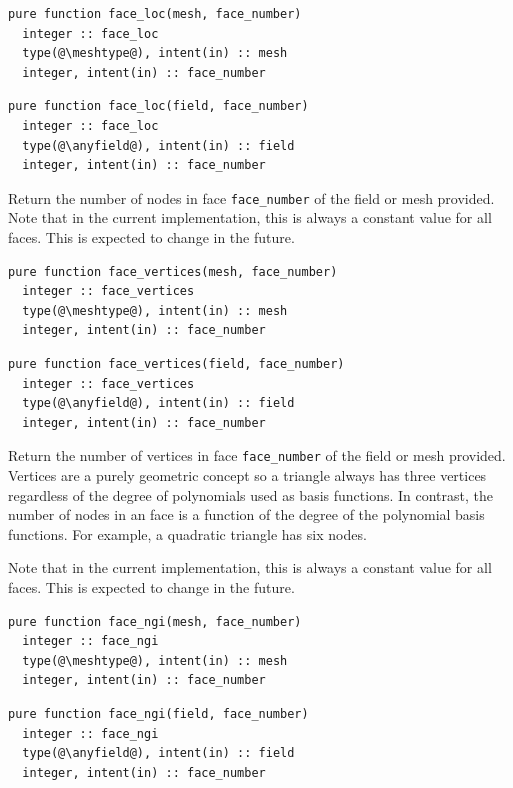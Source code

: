 \documentclass[a4paper, 11pt]{book}
\begin{document}
\begin{lstlisting}
pure function face_loc(mesh, face_number)
  integer :: face_loc
  type(@\meshtype@), intent(in) :: mesh
  integer, intent(in) :: face_number
\end{lstlisting}

\begin{lstlisting}
pure function face_loc(field, face_number)
  integer :: face_loc
  type(@\anyfield@), intent(in) :: field
  integer, intent(in) :: face_number
\end{lstlisting}

Return the number of nodes in face \lstinline+face_number+ of the field
or mesh provided. Note that in the current implementation, this is always a
constant value for all faces. This is expected to change in the future.


\begin{lstlisting}
pure function face_vertices(mesh, face_number)
  integer :: face_vertices
  type(@\meshtype@), intent(in) :: mesh
  integer, intent(in) :: face_number
\end{lstlisting}

\begin{lstlisting}
pure function face_vertices(field, face_number)
  integer :: face_vertices
  type(@\anyfield@), intent(in) :: field
  integer, intent(in) :: face_number
\end{lstlisting}

Return the number of vertices in face \lstinline+face_number+ of the field
or mesh provided. Vertices are a purely geometric concept so a triangle
always has three vertices regardless of the degree of polynomials used as 
basis functions. In contrast, the number of nodes in an face is a
function of the degree of the polynomial basis functions. For example, a
quadratic triangle has six nodes.

Note that in the current implementation, this is always a
constant value for all faces. This is expected to change in the future.



\begin{lstlisting}
pure function face_ngi(mesh, face_number)
  integer :: face_ngi
  type(@\meshtype@), intent(in) :: mesh
  integer, intent(in) :: face_number
\end{lstlisting}

\begin{lstlisting}
pure function face_ngi(field, face_number)
  integer :: face_ngi
  type(@\anyfield@), intent(in) :: field
  integer, intent(in) :: face_number
\end{lstlisting}
\end{document}
